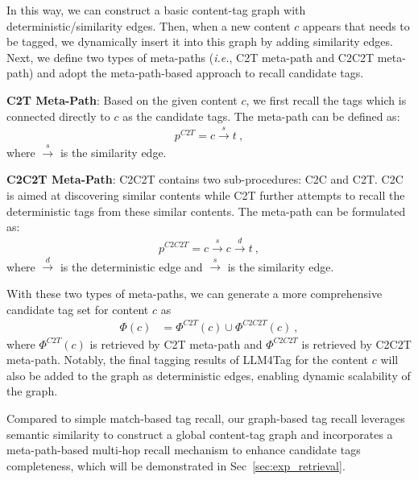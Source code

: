 In this way, we can construct a basic content-tag graph with deterministic/similarity edges. Then, when a new content $c$ appears that needs to be tagged, we dynamically insert it into this graph by adding similarity edges.
Next, we define two types of meta-paths (\textit{i.e.}, C2T meta-path and C2C2T meta-path) and adopt the meta-path-based approach to recall candidate tags.

\textbf{C2T Meta-Path}: Based on the given content $c$, we first recall the tags which is connected directly to $c$ as the candidate tags. The meta-path can be defined as:
\begin{equation}
\begin{aligned}
    p^{C2T} = c\overset{s}{\rightarrow} t~, 
\end{aligned}
\end{equation}
where $\overset{s}{\rightarrow}$ is the  similarity edge.

\textbf{C2C2T Meta-Path}: C2C2T contains two sub-procedures: C2C and C2T. C2C is aimed at discovering similar contents while C2T further attempts to recall the deterministic tags from these similar contents. The meta-path can be formulated as:
\begin{equation}
\begin{aligned}
    p^{C2C2T} = c\overset{s}{\rightarrow}c\overset{d}{\rightarrow}t~,
\end{aligned}
\end{equation}
where $\overset{d}{\rightarrow}$ is the deterministic edge and $\overset{s}{\rightarrow}$ is the similarity edge.

With these two types of meta-paths, we can generate a more comprehensive candidate tag set for content $c$ as
\begin{equation}
\begin{aligned}
    \Phi(c) &=  \Phi^{C2T}\left(c\right) \cup \Phi^{C2C2T}\left(c\right)~,
\end{aligned}
\end{equation}
where $\Phi^{C2T}\left(c\right)$ is retrieved by C2T meta-path and $\Phi^{C2C2T}$ is retrieved by C2C2T meta-path.
Notably, the final tagging results of LLM4Tag for the content $c$ will also be added to the graph as deterministic edges, enabling dynamic scalability of the graph.


Compared to simple match-based tag recall, our graph-based tag recall leverages semantic similarity to construct a global content-tag graph and incorporates a meta-path-based multi-hop recall mechanism to enhance candidate tags completeness, which will be demonstrated in Sec~\ref{sec:exp_retrieval}. 

